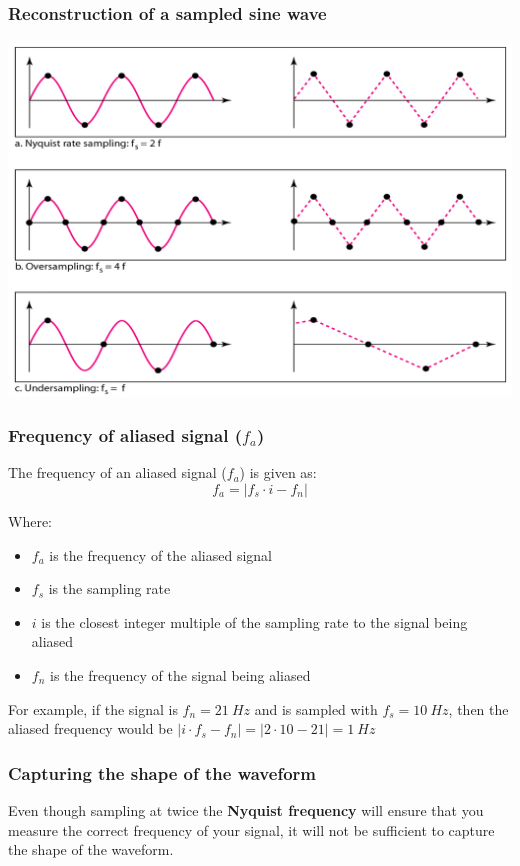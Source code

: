 \documentclass[11pt]{article}
\begin{document}
\subsubsection{Reconstruction of a sampled sine wave}
\label{sec:org90268c3}
\begin{center}
\includegraphics[width=.9\linewidth]{./images/sampling-reconstruction-of-sampled-sine-wave.png}
\end{center}
\subsubsection{Frequency of aliased signal (\(f_a\))}
\label{sec:org1a167ce}
The frequency of an aliased signal (\(f_a\)) is given as:
\[f_a = \left|f_s \cdot i - f_n \right|\]

Where:
\begin{itemize}
\item \(f_a\) is the frequency of the aliased signal
\item \(f_s\) is the sampling rate
\item \(i\) is the closest integer multiple of the sampling rate to the signal being aliased
\item \(f_n\) is the frequency of the signal being aliased
\end{itemize}

For example, if the signal is \(f_n = \qty{21}{Hz}\) and is sampled with \(f_s = \qty{10}{Hz}\), then the aliased frequency would be \(\left| i \cdot f_s - f_n \right| = | 2 \cdot 10 - 21 | = \qty{1}{Hz}\)
\subsubsection{Capturing the shape of the waveform}
\label{sec:org89f35e3}
Even though sampling at twice the \textbf{Nyquist frequency} will ensure that you measure the correct frequency of your signal, it will not be sufficient to capture the shape of the waveform.
\end{document}
